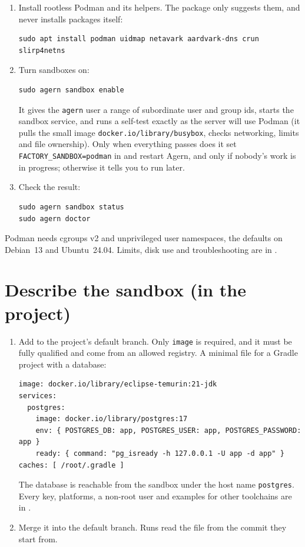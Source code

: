 \begin{enumerate}
  \item Install rootless Podman and its helpers. The package only suggests them, and
     never installs packages itself:
\begin{lstlisting}
sudo apt install podman uidmap netavark aardvark-dns crun slirp4netns
\end{lstlisting}
  \item Turn sandboxes on:
\begin{lstlisting}
sudo agern sandbox enable
\end{lstlisting}
    It gives the \texttt{agern} user a range of subordinate user and group ids, starts the sandbox
    service, and runs a self-test exactly as the server will use Podman (it pulls the small image
    \texttt{docker.io/library/busybox}, checks networking, limits and file ownership). Only when
    everything passes does it set \texttt{FACTORY\_SANDBOX=podman} in 
    and restart Agern, and only if nobody's work is in progress; otherwise it tells you to run
     later.
  \item Check the result:
\begin{lstlisting}
sudo agern sandbox status
sudo agern doctor
\end{lstlisting}
\end{enumerate}

Podman needs cgroups v2 and unprivileged user namespaces, the defaults on Debian~13 and
Ubuntu~24.04. Limits, disk use and troubleshooting are in
.

\section{Describe the sandbox (in the project)}\label{sec:sandbox-file}

\begin{enumerate}
  \item Add  to the project's default branch. Only \texttt{image} is
    required, and it must be fully qualified and come from an allowed registry. A minimal file for a
    Gradle project with a database:
\begin{lstlisting}[style=conf]
image: docker.io/library/eclipse-temurin:21-jdk
services:
  postgres:
    image: docker.io/library/postgres:17
    env: { POSTGRES_DB: app, POSTGRES_USER: app, POSTGRES_PASSWORD: app }
    ready: { command: "pg_isready -h 127.0.0.1 -U app -d app" }
caches: [ /root/.gradle ]
\end{lstlisting}
    The database is reachable from the sandbox under the host name \texttt{postgres}. Every key,
    platforms, a non-root user and examples for other toolchains are in
    .
  \item Merge it into the default branch. Runs read the file from the commit they start from.
\end{enumerate}

